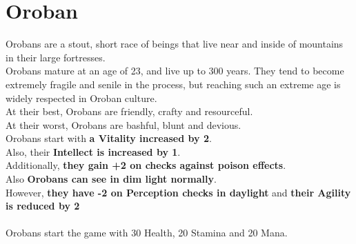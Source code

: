 \section{Oroban}\label{race:oroban}
Orobans are a stout, short race of beings that live near and inside of mountains in their large fortresses.\\
Orobans mature at an age of 23, and live up to 300 years.
They tend to become extremely fragile and senile in the process, but reaching such an extreme age is widely respected in Oroban culture.\\
At their best, Orobans are friendly, crafty and resourceful.\\
At their worst, Orobans are bashful, blunt and devious.\\
Orobans start with \textbf{a Vitality increased by 2}.\\
Also, their \textbf{Intellect is increased by 1}.\\
Additionally, \textbf{they gain +2 on checks against poison effects}.\\
Also \textbf{Orobans can see in dim light normally}.\\
However, \textbf{they have -2 on Perception checks in daylight} and \textbf{their Agility is reduced by 2}\\\\
Orobans start the game with 30 Health, 20 Stamina and 20 Mana.
